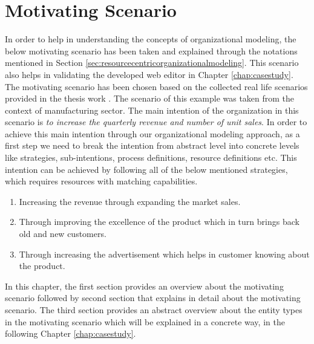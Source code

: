 \chapter{Motivating Scenario}
\label{chap:motivatingScenario}

In order to help in understanding the concepts of organizational modeling, the below motivating scenario has been taken and explained through the notations mentioned in Section \ref{sec:resourcecentricorganizationalmodeling}. This scenario also helps in validating the developed web editor in Chapter \ref{chap:casestudy}. The motivating scenario has been chosen based on the collected real life scenarios provided in the thesis work \cite{Sierr2015}. The scenario of this example was taken from the context of manufacturing sector. The main intention of the organization in this scenario is \textit{to increase the quarterly revenue and number of unit sales}. In order to achieve this main intention through our organizational modeling approach, as a first step we need to break the intention from abstract level into concrete levels like strategies, sub-intentions, process definitions, resource definitions etc. This intention can be achieved by following all of the below mentioned strategies, which requires resources with matching capabilities.  
\begin{enumerate}
	\item Increasing the revenue through expanding the market sales. 
	\item Through improving the excellence of the product which in turn brings back old and new customers.
	\item Through increasing the advertisement which helps in customer knowing about the product.
\end{enumerate}

In this chapter, the first section provides an overview about the motivating scenario followed by second section that explains in detail about the motivating scenario. The third section provides an abstract overview about the entity types in the motivating scenario which will be explained in a concrete way, in the following Chapter \ref{chap:casestudy}.

